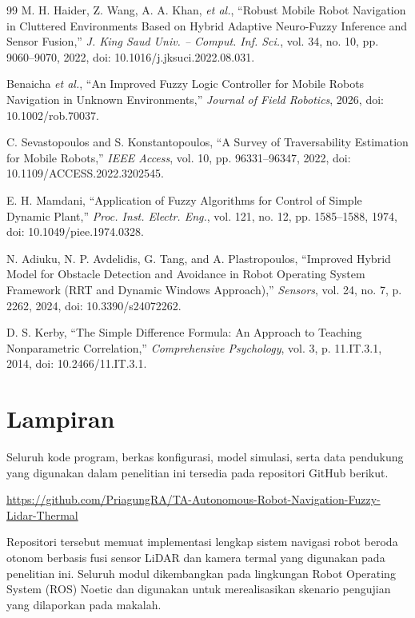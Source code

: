 \documentclass[10pt,twocolumn]{article}
\begin{document}
{\begin{thebibliography}{99}
 M. H. Haider, Z. Wang, A. A. Khan, \textit{et al.}, ``Robust Mobile Robot Navigation in Cluttered Environments Based on Hybrid Adaptive Neuro-Fuzzy Inference and Sensor Fusion,'' \textit{J. King Saud Univ. -- Comput. Inf. Sci.}, vol. 34, no. 10, pp. 9060--9070, 2022, doi: 10.1016/j.jksuci.2022.08.031.

 Benaicha \textit{et al.}, ``An Improved Fuzzy Logic Controller for Mobile Robots Navigation in Unknown Environments,'' \textit{Journal of Field Robotics}, 2026, doi: 10.1002/rob.70037.

 C. Sevastopoulos and S. Konstantopoulos, ``A Survey of Traversability Estimation for Mobile Robots,'' \textit{IEEE Access}, vol. 10, pp. 96331--96347, 2022, doi: 10.1109/ACCESS.2022.3202545.

 E. H. Mamdani, ``Application of Fuzzy Algorithms for Control of Simple Dynamic Plant,'' \textit{Proc. Inst. Electr. Eng.}, vol. 121, no. 12, pp. 1585--1588, 1974, doi: 10.1049/piee.1974.0328.

 N. Adiuku, N. P. Avdelidis, G. Tang, and A. Plastropoulos, ``Improved Hybrid Model for Obstacle Detection and Avoidance in Robot Operating System Framework (RRT and Dynamic Windows Approach),'' \textit{Sensors}, vol. 24, no. 7, p. 2262, 2024, doi: 10.3390/s24072262.

 D. S. Kerby, ``The Simple Difference Formula: An Approach to Teaching Nonparametric Correlation,'' \textit{Comprehensive Psychology}, vol. 3, p. 11.IT.3.1, 2014, doi: 10.2466/11.IT.3.1.

\end{thebibliography}
}

\section*{Lampiran}

Seluruh kode program, berkas konfigurasi, model simulasi, serta data pendukung yang digunakan dalam penelitian ini tersedia pada repositori GitHub berikut.

\begin{center}
{\footnotesize
\url{https://github.com/PriagungRA/TA-Autonomous-Robot-Navigation-Fuzzy-Lidar-Thermal}
}
\end{center}

Repositori tersebut memuat implementasi lengkap sistem navigasi robot beroda otonom berbasis fusi sensor LiDAR dan kamera termal yang digunakan pada penelitian ini. Seluruh modul dikembangkan pada lingkungan Robot Operating System (ROS) Noetic dan digunakan untuk merealisasikan skenario pengujian yang dilaporkan pada makalah.
\end{document}
